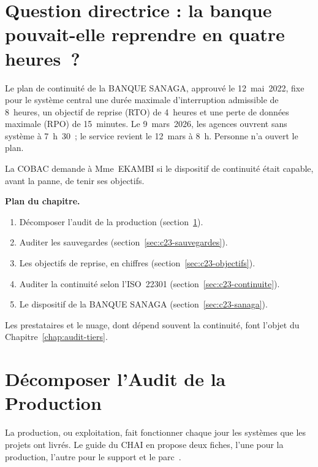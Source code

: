 \bigskip

\section*{Question directrice : la banque pouvait-elle reprendre en quatre heures~?}

Le plan de continuité de la BANQUE SANAGA, approuvé le 12~mai~2022, fixe
pour le système central une durée maximale d'interruption admissible de
8~heures, un objectif de reprise (RTO) de 4~heures et une perte de données
maximale (RPO) de 15~minutes. Le 9~mars~2026, les agences ouvrent sans
système à 7~h~30~; le service revient le 12~mars à 8~h. Personne n'a ouvert
le plan.

La COBAC demande à Mme~EKAMBI si le dispositif de continuité était
capable, avant la panne, de tenir ses objectifs.

\medskip
\textbf{Plan du chapitre.}
\begin{enumerate}
    \item Décomposer l'audit de la production (section~\ref{sec:c23-production}).
    \item Auditer les sauvegardes (section~\ref{sec:c23-sauvegardes}).
    \item Les objectifs de reprise, en chiffres (section~\ref{sec:c23-objectifs}).
    \item Auditer la continuité selon l'ISO~22301 (section~\ref{sec:c23-continuite}).
    \item Le dispositif de la BANQUE SANAGA (section~\ref{sec:c23-sanaga}).
\end{enumerate}
Les prestataires et le nuage, dont dépend souvent la continuité, font
l'objet du Chapitre~\ref{chap:audit-tiers}.

\separateur

\section{Décomposer l'Audit de la Production}
\label{sec:c23-production}

La production, ou exploitation, fait fonctionner chaque jour les systèmes
que les projets ont livrés. Le guide du CHAI en propose deux fiches, l'une
pour la production, l'autre pour le support et le parc~\cite{chai2014guide}.

